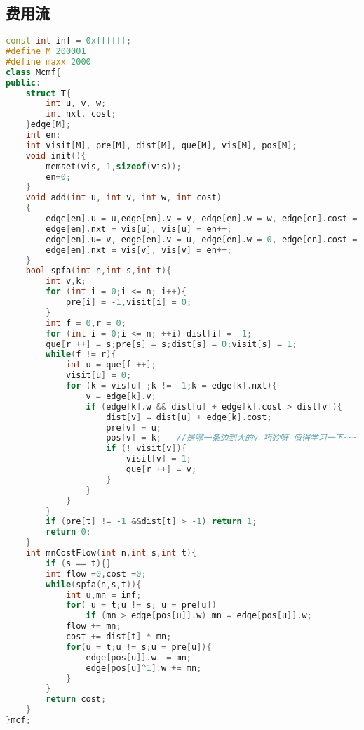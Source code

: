\subsection{费用流}
		\begin{lstlisting}[language=c++]
const int inf = 0xffffff;
#define M 200001
#define maxx 2000
class Mcmf{
public:
	struct T{
		int u, v, w;
		int nxt, cost;
	}edge[M];
	int en;
	int visit[M], pre[M], dist[M], que[M], vis[M], pos[M];
	void init(){
		memset(vis,-1,sizeof(vis));
		en=0;
	}
	void add(int u, int v, int w, int cost)  
	{
		edge[en].u = u,edge[en].v = v, edge[en].w = w, edge[en].cost = cost;
		edge[en].nxt = vis[u], vis[u] = en++;
		edge[en].u= v, edge[en].v = u, edge[en].w = 0, edge[en].cost = -cost;
		edge[en].nxt = vis[v], vis[v] = en++;
	}
	bool spfa(int n,int s,int t){
		int v,k;
		for (int i = 0;i <= n; i++){
			pre[i] = -1,visit[i] = 0;
		}
		int f = 0,r = 0;	
		for (int i = 0;i <= n; ++i) dist[i] = -1;
		que[r ++] = s;pre[s] = s;dist[s] = 0;visit[s] = 1;
		while(f != r){
			int u = que[f ++];
			visit[u] = 0;
			for (k = vis[u] ;k != -1;k = edge[k].nxt){   
				v = edge[k].v;
				if (edge[k].w && dist[u] + edge[k].cost > dist[v]){
					dist[v] = dist[u] + edge[k].cost;
					pre[v] = u;
					pos[v] = k;   //是哪一条边到大的v 巧妙呀 值得学习一下~~~
					if (! visit[v]){
						visit[v] = 1;
						que[r ++] = v;
					}
				}
			}
		}
		if (pre[t] != -1 &&dist[t] > -1) return 1;
		return 0;
	}
	int mnCostFlow(int n,int s,int t){
		if (s == t){}
		int flow =0,cost =0;
		while(spfa(n,s,t)){
			int u,mn = inf;
			for( u = t;u != s; u = pre[u]) 
				if (mn > edge[pos[u]].w) mn = edge[pos[u]].w;
			flow += mn;
			cost += dist[t] * mn;
			for(u = t;u != s;u = pre[u]){
				edge[pos[u]].w -= mn;
				edge[pos[u]^1].w += mn;
			}
		}
		return cost;
	}
}mcf;
	\end{lstlisting}